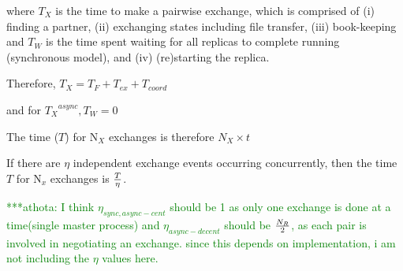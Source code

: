 \documentclass{rspublic}
\newcommand{\athotanote}[1]{ {\textcolor{green} { ***athota: #1 }}}
\newcommand{\athotanote}[1]{}
\begin{document}
where $T_{X}$ is the time to make a pairwise exchange, which is comprised of (i) finding a partner, (ii) exchanging
states including file transfer, (iii) book-keeping and $T_{W}$ is the time spent waiting for all replicas to complete running (synchronous model), and (iv) (re)starting the replica.

Therefore, ${T_{X}} = {T_F + T_{ex} + T_{coord}}$ 

and for ${T_{X}}^{async}, T_W = 0$

The time ($T$) for N$_{X}$ exchanges is therefore $N_{X} \times t$

If there are $\eta$ independent exchange events occurring concurrently, then the time $T$ for 
N$_x$ exchanges is $T \over \eta$.













\athotanote{I think $\eta_{sync,async-cent}$ should be 1 as only one exchange is done at a time(single master process) and $\eta_{async-decent}$ should be $N_R \over 2$, as each pair is involved in negotiating an exchange. since this depends on implementation, i am not including the $\eta$ values here.}
\end{document}
